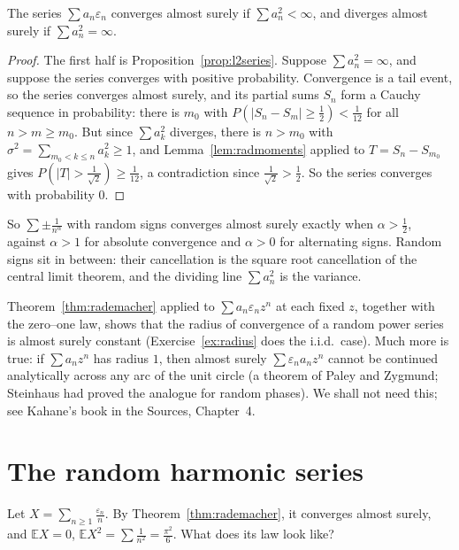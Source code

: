 \begin{theorem}\label{thm:rademacher}
The series $\sum a_n\varepsilon_n$ converges almost surely if $\sum a_n^2<\infty$, and diverges almost surely if $\sum a_n^2=\infty$.
\end{theorem}
\begin{proof}
The first half is Proposition~\ref{prop:l2series}. Suppose $\sum a_n^2=\infty$, and suppose the series converges with positive
probability. Convergence is a tail event, so the series converges almost surely, and its partial sums $S_n$ form a Cauchy
sequence in probability: there is $m_0$ with $P(|S_n-S_m|\ge\frac12)<\frac1{12}$ for all $n>m\ge m_0$. But since $\sum a_k^2$
diverges, there is $n>m_0$ with $\sigma^2=\sum_{m_0<k\le n}a_k^2\ge1$, and Lemma~\ref{lem:radmoments} applied to
$T=S_n-S_{m_0}$ gives $P(|T|>\frac1{\sqrt2})\ge\frac1{12}$, a contradiction since $\frac1{\sqrt2}>\frac12$. So the series
converges with probability $0$.
\end{proof}

So $\sum\pm\frac1{n^\alpha}$ with random signs converges almost surely exactly when $\alpha>\frac12$, against $\alpha>1$ for
absolute convergence and $\alpha>0$ for alternating signs. Random signs sit in between: their cancellation is the square
root cancellation of the central limit theorem, and the dividing line $\sum a_n^2$ is the variance.

\begin{remark}
Theorem~\ref{thm:rademacher} applied to $\sum a_n\varepsilon_nz^n$ at each fixed $z$, together with the zero--one law, shows that
the radius of convergence of a random power series is almost surely constant (Exercise~\ref{ex:radius} does the i.i.d.\ case).
Much more is true: if $\sum a_nz^n$ has radius $1$, then almost surely $\sum\varepsilon_na_nz^n$ cannot be continued analytically
across any arc of the unit circle (a theorem of Paley and Zygmund; Steinhaus had proved the analogue for random phases). We shall not need this; see
Kahane's book in the Sources, Chapter~4.
\end{remark}

\section{The random harmonic series}

Let $X=\sum_{n\ge1}\frac{\varepsilon_n}n$. By Theorem~\ref{thm:rademacher}, it converges almost surely, and $\mathbb E X=0$,
$\mathbb E X^2=\sum\frac1{n^2}=\frac{\pi^2}6$. What does its law look like?

